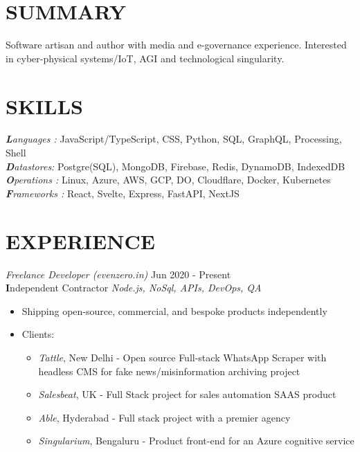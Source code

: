\documentclass[margin, 10pt]{res} %
\begin{document}
\begin{resume}

\section{\ttfamily SUMMARY}  
Software artisan and author with media and e-governance experience. Interested in cyber-physical systems/IoT, AGI and technological singularity.

\section{\ttfamily \color{Black} SKILLS} 

{\sl\textbf Languages :} JavaScript/TypeScript, CSS, Python, SQL, GraphQL, Processing, Shell\\
{\sl\textbf Datastores:} Postgre(SQL), MongoDB, Firebase, Redis, DynamoDB, IndexedDB\\
{\sl\textbf Operations :} Linux, Azure, AWS, GCP, DO, Cloudflare, Docker, Kubernetes\\
{\sl\textbf Frameworks :} React, Svelte, Express, FastAPI, NextJS\\


\section{\ttfamily EXPERIENCE}

{\sl Freelance Developer (evenzero.in)} \hfill Jun 2020 - \color{RubineRed} Present\color{Black}\\
\textbf Independent Contractor \hfill {\scriptsize \it Node.js, NoSql, APIs, DevOps, QA}
\begin{itemize}
\item Shipping open-source, commercial, and bespoke products independently
\item Clients:
\begin{itemize}
\item {\sl Tattle}, New Delhi - Open source Full-stack WhatsApp Scraper with headless CMS for fake news/misinformation archiving project
\item {\sl Salesbeat}, UK - Full Stack project for sales automation SAAS product
\item {\sl Able}, Hyderabad - Full stack project with a premier agency
\item {\sl Singularium}, Bengaluru - Product front-end for an Azure cognitive service
\end{itemize}
\end{itemize}


\end{resume}
\end{document}
